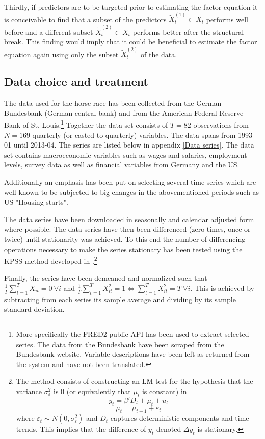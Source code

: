 \documentclass[12pt]{article}
\begin{document}
Thirdly, if predictors are to be targeted prior to estimating the factor equation it is conceivable to find that a subset of the predictors $\tilde X_t^{(1)} \subset X_t$ performs well before and a different subset $\tilde X_t^{(2)} \subset X_t$ performs better after the structural break. This finding would imply that it could be beneficial to estimate the factor equation again using only the subset $\tilde X_t^{(2)}$ of the data.


\subsection{Data choice and treatment}
The data used for the horse race has been collected from the German Bundesbank (German central bank) and from the American Federal Reserve Bank of St. Louis.\footnote{More specifically the FRED2 public API has been used to extract selected series. The data from the Bundesbank have been scraped from the Bundesbank website. Variable descriptions have been left as returned from the system and have not been translated.}  Together the data set consists of $T=82$ observations from $N=169$ quarterly (or casted to quarterly) variables. The data spans from 1993-01 until 2013-04. The series are listed below in appendix \ref{Data series}. The data set contains macroeconomic variables such as wages and salaries, employment levels, survey data as well as financial variables from Germany and the US.

Additionally an emphasis has been put on selecting several time-series which are well known to be subjected to big changes in the abovementioned periods such as US "Housing starts".


The data series have been downloaded in seasonally and calendar adjusted form where possible. The data series have then been differenced (zero times, once or twice) until stationarity was achieved. To this end the number of differencing operations necessary to make the series stationary has been tested using the KPSS method developed in \citet{kwiatkowski1992testing}.\footnote{The method consists of constructing an LM-test for the hypothesis that the variance $\sigma^2_\varepsilon$ is 0 (or equivalently that $\mu_t$ is constant) in $$y_t = \beta'D_t + \mu_t + u_t$$ $$\mu_t = \mu_{t-1} + \varepsilon_t$$ where $\varepsilon_t \sim N(0, \sigma^2_\varepsilon)$ and $D_t$ captures deterministic components and time trends. This implies that the difference of $y_t$ denoted $\Delta y_t$ is stationary.}

Finally, the series have been demeaned and normalized such that $\frac{1}{T}\sum_{t=1}^T X_{it} = 0 \ \forall i$ and $\frac{1}{T}\sum_{t=1}^T X_{it}^2 = 1 \Leftrightarrow \sum_{t=1}^T X_{it}^2 = T \ \forall i$. This is achieved by subtracting from each series its sample average and dividing by its sample standard deviation.\\
\end{document}
